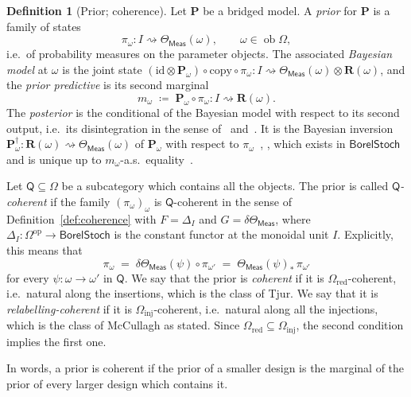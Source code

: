 \documentclass[11pt,a4paper]{article}
\theoremstyle{plain}
\theoremstyle{definition}
\newtheorem{definition}[theorem]{Definition}
\theoremstyle{remark}
\newcommand{\cat}[1]{\mathsf{#1}}
\newcommand{\catO}{\cat{\Omega}}
\newcommand{\Meas}{\cat{Meas}}
\newcommand{\op}{\mathrm{op}}
\newcommand{\id}{\mathrm{id}}
\newcommand{\del}{\delta}
\DeclareMathOperator{\ob}{ob}
\newcommand{\BorelStoch}{\cat{BorelStoch}}
\begin{document}
\begin{definition}[Prior; coherence]\label{def:prior}
Let $\mathbf P$ be a bridged model. A \emph{prior} for $\mathbf P$ is a family
of states
\[
\pi_{\omega} \colon I \rightsquigarrow \Theta_\Meas(\omega),
\qquad \omega \in \ob\catO ,
\]
i.e.\ of probability measures on the parameter objects. The associated
\emph{Bayesian model} at $\omega$ is the joint state
$(\id \otimes \mathbf P_{\omega}) \circ \mathrm{copy} \circ \pi_{\omega}
\colon I \rightsquigarrow \Theta_\Meas(\omega) \otimes \mathbf{R}(\omega)$,
and the \emph{prior predictive} is its second marginal
\[
m_{\omega} \;\coloneqq\; \mathbf P_{\omega} \circ \pi_{\omega}
\colon I \rightsquigarrow \mathbf{R}(\omega).
\]
The \emph{posterior} is the conditional of the Bayesian model with respect to
its second output, i.e.\ its disintegration in the sense
of~\cite[Def.~3.5]{cho_disintegration_2019}
and~\cite[Def.~11.1]{fritz_synthetic_2020}. It is the Bayesian inversion
$\mathbf P_{\omega}^{\dagger} \colon \mathbf{R}(\omega) \rightsquigarrow
\Theta_\Meas(\omega)$ of $\mathbf P_{\omega}$ with respect to
$\pi_{\omega}$~\cite[eq.~(5)]{cho_disintegration_2019},
\cite[eq.~(13.2)]{fritz_synthetic_2020}, which exists in $\BorelStoch$ and is
unique up to $m_{\omega}$-a.s.\
equality~\cite[Prop.~13.7]{fritz_synthetic_2020}.

Let $\cat{Q} \subseteq \catO$ be a subcategory which contains all the objects.
The prior is called \emph{$\cat{Q}$-coherent} if the family
$(\pi_{\omega})_{\omega}$ is $\cat{Q}$-coherent in the sense of
Definition~\ref{def:coherence} with $F = \Delta_{I}$ and
$G = \del\Theta_\Meas$, where
$\Delta_{I} \colon \catO^{\op} \to \BorelStoch$ is the constant functor at the
monoidal unit $I$. Explicitly, this means that
\begin{equation}\label{eq:priorsquare}
\pi_{\omega} \;=\; \del\Theta_\Meas(\psi)\circ\pi_{\omega'}
\;=\; \Theta_\Meas(\psi)_{*}\,\pi_{\omega'}
\end{equation}
for every $\psi \colon \omega \to \omega'$ in $\cat{Q}$. We say that the prior
is \emph{coherent} if it is $\catO_{\mathrm{red}}$-coherent, i.e.\ natural
along the insertions, which is the class of Tjur. We say that it is
\emph{relabelling-coherent} if it is $\catO_{\mathrm{inj}}$-coherent, i.e.\
natural along all the injections, which is the class of McCullagh as stated.
Since $\catO_{\mathrm{red}} \subseteq \catO_{\mathrm{inj}}$, the second
condition implies the first one.
\end{definition}

In words, a prior is coherent if the prior of a smaller design is the marginal
of the prior of every larger design which contains it.
\end{document}
